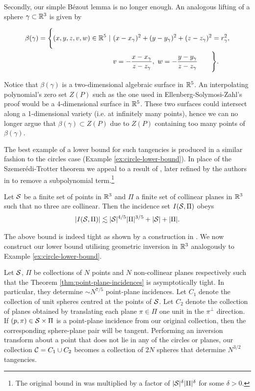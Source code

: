 Secondly, our simple Bézout lemma is no longer enough. An analogous lifting of a sphere $\gamma \subset \mathbb R^3$ is given by

\begin{align*}
    \beta(\gamma) = \Biggl \{ (x,y,z,v,w) \in \RR^5 \ | \ &(x-x_\gamma)^2 + (y-y_\gamma)^2 + (z-z_\gamma)^2 = r_\gamma^2, \\
     &v = - \frac{x-x_\gamma}{z-z_\gamma}, \ w = - \frac{y-y_\gamma}{z-z_\gamma} \qquad  \Biggr \} .
\end{align*}


Notice that $\beta(\gamma)$ is a two-dimensional algebraic surface in $\mathbb R^5$. An interpolating polynomial's zero set $Z(P)$ such as the one used in Ellenberg-Solymosi-Zahl's proof would be a 4-dimensional surface in $\mathbb R^5$.
These two surfaces could intersect along a 1-dimensional variety (i.e. at infinitely many points), hence we can no longer argue that $\beta(\gamma) \subset Z(P)$ due to $Z(P)$ containing too many points of $\beta(\gamma)$.

The best example of a lower bound for such tangencies is produced in a similar fashion to the circles case (Example \ref{ex:circle-lower-bound}). 
In place of the Szemerédi-Trotter theorem we appeal to a result of \cite{Guibas1990}, later refined by the authors in \cite{Sharir2007} to remove a subpolynomial term.\footnote{The original bound in \cite{Guibas1990} was multiplied by a factor of $|\mathcal S|^\delta|\Pi|^\delta$ for some $\delta>0$.}
\begin{theorem}
    Let $\mathcal S$ be a finite set of points in $\mathbb R^3$ and $\Pi$ a finite set of collinear planes in $\mathbb R^3$ such that no three are collinear. \label{thm:point-plane-incidences}
    Then the incidence set $I(\mathcal S, \Pi)$ obeys
    \[
        |I(\mathcal S, \Pi)| \lesssim |\mathcal S|^{4/5}|\Pi|^{3/5} + |\mathcal S| + |\Pi|.
    \] 
\end{theorem}
The above bound is indeed tight as shown by a construction in \cite{Knauer2003}.
We now construct our lower bound utilising geometric inversion in $\mathbb R^3$ analogously to Example \ref{ex:circle-lower-bound}.

\begin{example}
    Let $\mathcal S$, $\Pi$ be collections of $N$ points and $N$ non-collinear planes respectively such that the Theorem \ref{thm:point-plane-incidences} is asymptotically tight. 
    In particular, they determine $\sim N^{7/5}$ point-plane incidences. 
    Let $C_1$ denote the collection of unit spheres centred at the points of $\mathcal S$. 
    Let $C_2$ denote the collection of planes obtained by translating each plane $\pi \in \Pi$ one unit in the $\pi^{\perp}$ direction.
    If $(p,\pi) \in \mathcal S \times \Pi$ is a point-plane incidence from our original collection, then the corresponding sphere-plane pair will be tangent.
    Performing an inversion transform about a point that does not lie in any of the circles or planes, our collection $\mathcal C = C_1 \cup C_2$ becomes a 
    collection of $2N$ spheres that determine $N^{3/2}$ tangencies.
 \end{example}

